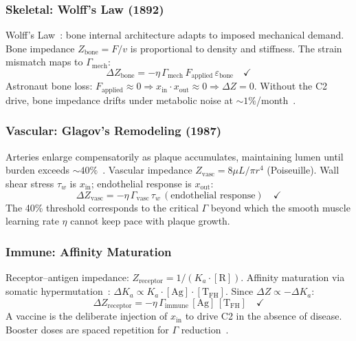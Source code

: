 \documentclass[aps,pre,twocolumn,superscriptaddress,floatfix]{revtex4-2}
\begin{document}
\subsubsection{Skeletal: Wolff's Law (1892)}

Wolff's Law~\cite{Wolff1892}: bone internal architecture
adapts to imposed mechanical demand.
Bone impedance $Z_{\text{bone}} = F/v$ is proportional
to density and stiffness.  The strain mismatch maps
to $\Gamma_{\text{mech}}$:
\begin{equation}
  \Delta Z_{\text{bone}}
  = -\eta\,\Gamma_{\text{mech}}\,
    F_{\text{applied}}\,\varepsilon_{\text{bone}}
  \quad \checkmark
  \label{eq:wolff-C2}
\end{equation}
Astronaut bone loss: $F_{\text{applied}} \approx 0
\Rightarrow x_{\text{in}} \cdot x_{\text{out}} \approx 0
\Rightarrow \Delta Z = 0$.
Without the C2 drive, bone impedance drifts
under metabolic noise at $\sim 1\%$/month~\cite{Lang2004}.

\subsubsection{Vascular: Glagov's Remodeling (1987)}

Arteries enlarge compensatorily as plaque accumulates,
maintaining lumen until burden exceeds
$\sim 40\%$~\cite{Glagov1987}.
Vascular impedance $Z_{\text{vasc}} = 8\mu L / \pi r^4$
(Poiseuille).  Wall shear stress $\tau_w$ is
$x_{\text{in}}$; endothelial response is $x_{\text{out}}$:
\begin{equation}
  \Delta Z_{\text{vasc}}
  = -\eta\,\Gamma_{\text{vasc}}\,
    \tau_w\,(\text{endothelial response})
  \quad \checkmark
  \label{eq:glagov-C2}
\end{equation}
The 40\% threshold corresponds to the critical $\Gamma$
beyond which the smooth muscle learning rate $\eta$ cannot
keep pace with plaque growth.

\subsubsection{Immune: Affinity Maturation}

Receptor--antigen impedance:
$Z_{\text{receptor}} = 1/(K_a \cdot [\text{R}])$.
Affinity maturation via somatic
hypermutation~\cite{Victora2012}:
$\Delta K_a \propto K_a \cdot [\text{Ag}] \cdot
[\text{T}_{\text{FH}}]$.
Since $\Delta Z \propto -\Delta K_a$:
\begin{equation}
  \Delta Z_{\text{receptor}}
  = -\eta\,\Gamma_{\text{immune}}\,
    [\text{Ag}]\,[\text{T}_{\text{FH}}]
  \quad \checkmark
  \label{eq:immune-C2}
\end{equation}
A vaccine is the deliberate injection of $x_{\text{in}}$
to drive C2 in the absence of disease.
Booster doses are spaced repetition for $\Gamma$
reduction~\cite{Cepeda2006}.
\end{document}
